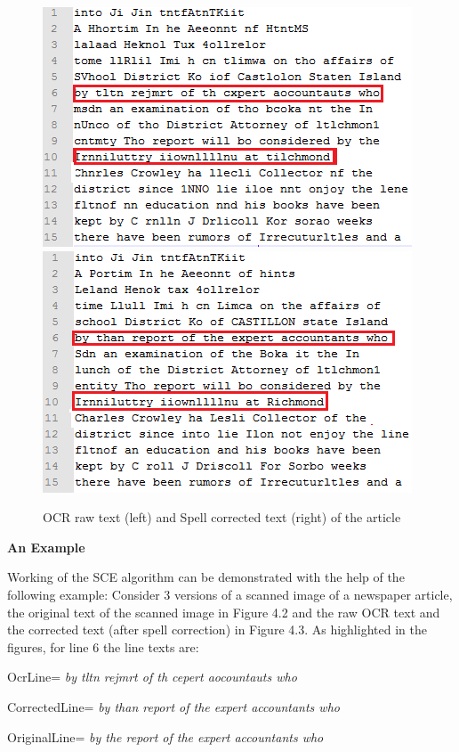 \documentclass[letterpaper,11pt]{report}
\begin{document}
\begin{figure} [!htb]
\includegraphics[scale=0.75]{ocr3}
\includegraphics[scale=0.75]{corrected3}
\caption{OCR raw text (left) and Spell corrected text (right) of the article}
\end{figure} 


\textbf{An Example}


Working of the SCE algorithm can be demonstrated with the help of the following example:
Consider 3 versions of a scanned image of a newspaper article,  the original text of the scanned image in Figure 4.2 and the raw OCR text and the corrected text (after spell correction) in Figure 4.3. As highlighted in the figures, for line 6 the line texts are:

 OcrLine= \textit{by tltn rejmrt of th cepert aocountauts who}

CorrectedLine= \textit{by than report of the expert accountants who}

OriginalLine= \textit{by the report of the expert accountants who} 
\end{document}
